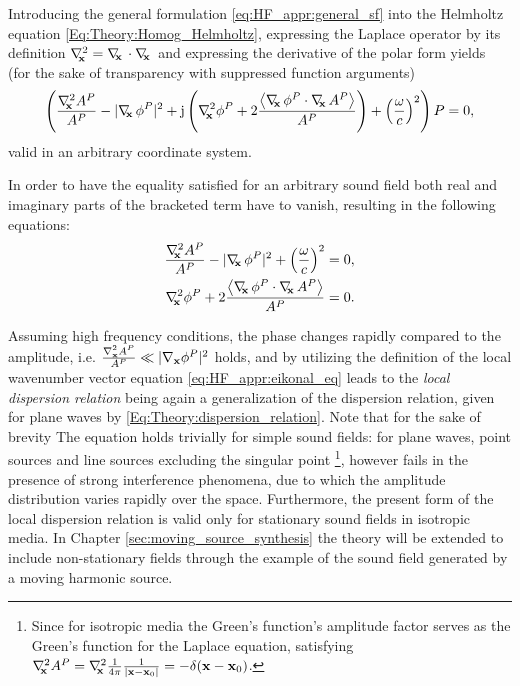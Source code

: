 Introducing the general formulation \eqref{eq:HF_appr:general_sf} into the Helmholtz equation \eqref{Eq:Theory:Homog_Helmholtz}, expressing the Laplace operator by its definition $\nabla^2_{\!\!\mathbf{x}} = \nabla_{\!\!\mathbf{x}}\, \cdot \nabla_{\!\!\mathbf{x}}\,$ and expressing the derivative of the polar form yields (for the sake of transparency with suppressed function arguments)
\begin{equation}
\left( 
\frac{\Lx A^P}{A^P} 
- 
| \Dx \phi^P |^2
+ 
\ti \left(  
\Lx \phi^P
+ 2\frac{ \left< \Dx \phi^P \cdot \Dx A^P \right> }{A^P} 
\right)
+ \left(\frac{\omega}{c}\right)^2 
\right) 
P = 0,
\label{eq:HF_appr:ray_tracing_helmholtz}
\end{equation}
valid in an arbitrary coordinate system.

In order to have the equality satisfied for an arbitrary sound field both real and imaginary parts of the bracketed term have to vanish, resulting in the following equations:
\begin{eqnarray} \label{eq:HF_appr:eikonal_eq}
\frac{\Lx A^P}{A^P}  - | \Dx \phi^P |^2 + \left(\frac{\omega}{c}\right)^2 = 0, \\ 
\label{eq:HF_appr:transport_eq}
\Lx \phi^P + 2\frac{ \left< \Dx \phi^P \cdot \Dx A^P \right> }{A^P} = 0.
\end{eqnarray}

Assuming high frequency conditions, the phase changes rapidly compared to the amplitude, i.e. $\frac{\nabla^2_{\mathbf{x}} A^P}{A^P} \ll | \nabla_{\mathbf{x}} \phi^P |^2$ holds, 
and by utilizing the definition of the local wavenumber vector equation \eqref{eq:HF_appr:eikonal_eq} leads to the \emph{local dispersion relation}
being again a generalization of the dispersion relation, given for plane waves by \eqref{Eq:Theory:dispersion_relation}.
%
Note that for the sake of brevity 
The equation holds trivially for simple sound fields: for plane waves, point sources and line sources excluding the singular point \footnote{Since for isotropic media the Green's function's amplitude factor serves as the Green's function for the Laplace equation, satisfying $\nabla^2_{\!\!\mathbf{x}} A^P = \nabla^2_{\!\!\mathbf{x}} \frac{1}{4\pi} \frac{1}{|\mathbf{x}-\mathbf{x}_0|} = -\delta(\mathbf{x}-\mathbf{x}_0)$.}, however fails in the presence of strong interference phenomena, due to which the amplitude distribution varies rapidly over the space.
Furthermore, the present form of the local dispersion relation is valid only for stationary sound fields in isotropic media.
In Chapter \ref{sec:moving_source_synthesis} the theory will be extended to include non-stationary fields through the example of the sound field generated by a moving harmonic source.

